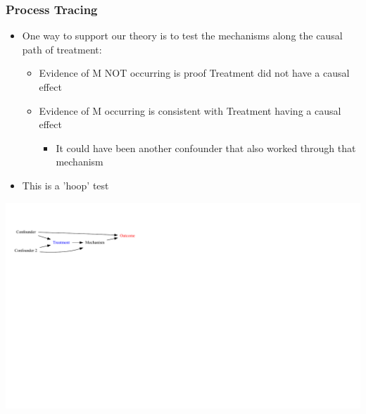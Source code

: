 \documentclass[xcolor=x11names,compress]{beamer}\usepackage[]{graphicx}\usepackage[]{color}
\newenvironment{knitrout}{}{} %
\renewcommand{\(}{\begin{columns}}
\renewcommand{\)}{\end{columns}}
\newcommand{\<}[1]{\begin{column}{#1}}
\renewcommand{\>}{\end{column}}
\begin{document}
\begin{frame}
\frametitle{Process Tracing}
\begin{itemize}
\item One way to support our theory is to test the mechanisms along the causal path of treatment:
\begin{itemize}
\item Evidence of M NOT occurring is proof Treatment did not have a causal effect
\item Evidence of M occurring is consistent with Treatment having a causal effect
\begin{itemize}
\item It could have been another confounder that also worked through that mechanism
\pause
\end{itemize}
\end{itemize}
\item This is a 'hoop' test
\end{itemize}
\begin{knitrout}
\color{fgcolor}
\includegraphics[width=1.8\linewidth]{figure/Dag3-1} 

\end{knitrout}
\end{frame}
\end{document}

